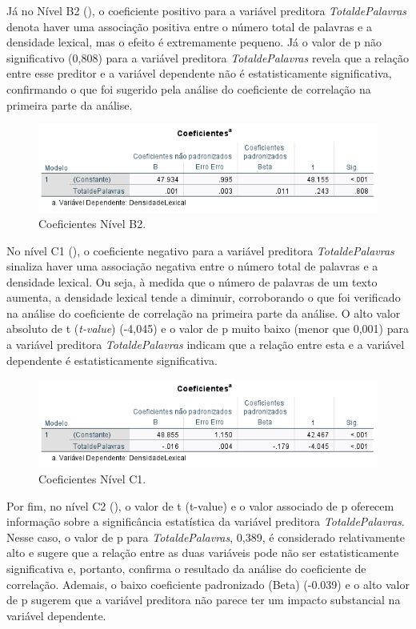 \documentclass[portuguese]{textolivre}
\begin{document}
Já no Nível B2 (), o coeficiente positivo para a variável preditora \textit{TotaldePalavras} denota haver uma associação positiva entre o número total de palavras e a densidade lexical, mas o efeito é extremamente pequeno. Já o valor de p não significativo (0,808) para a variável preditora \textit{TotaldePalavras} revela que a relação entre esse preditor e a variável dependente não é estatisticamente significativa, confirmando o que foi sugerido pela análise do coeficiente de correlação na primeira parte da análise.

\begin{figure}[h!]
    \centering
    \includegraphics[width=0.8\linewidth]{Fig19.png}
    \caption{Coeficientes Nível B2.}
    \label{fig19}
\end{figure}

No nível C1 (), o coeficiente negativo para a variável preditora \textit{TotaldePalavras} sinaliza haver uma associação negativa entre o número total de palavras e a densidade lexical. Ou seja, à medida que o número de palavras de um texto aumenta, a densidade lexical tende a diminuir, corroborando o que foi verificado na análise do coeficiente de correlação na primeira parte da análise. O alto valor absoluto de t (\textit{t-value}) (-4,045) e o valor de p muito baixo (menor que 0,001) para a variável preditora \textit{TotaldePalavras} indicam que a relação entre esta e a variável dependente é estatisticamente significativa. 

\begin{figure}[h!]
    \centering
    \includegraphics[width=0.8\linewidth]{Fig20.png}
    \caption{Coeficientes Nível C1.}
    \label{fig20}
\end{figure}

Por fim, no nível C2 (), o valor de t (t-value) e o valor associado de p oferecem informação sobre a significância estatística da variável preditora \textit{TotaldePalavras}. Nesse caso, o valor de p para \textit{TotaldePalavras}, 0,389, é considerado relativamente alto e sugere que a relação entre as duas variáveis pode não ser estatisticamente significativa e, portanto, confirma o resultado da análise do coeficiente de correlação. Ademais, o baixo coeficiente padronizado (Beta) (-0.039) e o alto valor de p sugerem que a variável preditora não parece ter um impacto substancial na variável dependente. 
\end{document}

